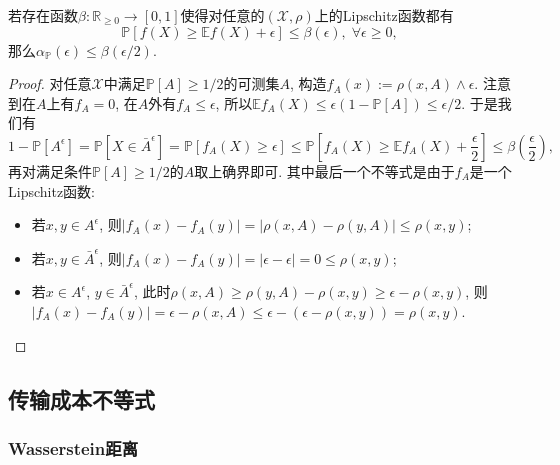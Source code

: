 \begin{theorem}
	若存在函数$\beta \colon \mathbb{R}_{\geq 0} \to [0, 1]$使得对任意的$(\mathcal{X}, \rho)$上的Lipschitz函数都有
	\begin{equation*}
		\mathbb{P}[f(X) \geq \mathbb{E}f(X) + \epsilon] \leq \beta(\epsilon),\; \forall \epsilon \geq 0, 
	\end{equation*}
	那么$\alpha_{\mathbb{P}}(\epsilon) \leq \beta(\epsilon / 2)$. 
\end{theorem}
\begin{proof}
	对任意$\mathcal{X}$中满足$\mathbb{P}[A] \geq 1/2$的可测集$A$, 构造$f_A(x) := \rho(x, A) \wedge \epsilon$. 
	注意到在$A$上有$f_A = 0$, 在$A$外有$f_A \leq \epsilon$, 所以$\mathbb{E}f_A(X) \leq \epsilon (1 - \mathbb{P}[A]) \leq \epsilon / 2$. 
	于是我们有
	\begin{equation*}
		1 - \mathbb{P}[A^\epsilon]
		= \mathbb{P}[X \in \bar A^{\epsilon}]
		= \mathbb{P}[f_A(X) \geq \epsilon] 
		\leq \mathbb{P}\left[f_A(X) \geq \mathbb{E}f_A(X) + \frac{\epsilon}{2}\right]
		\leq \beta\left( \frac{\epsilon}{2} \right),  
	\end{equation*}
	再对满足条件$\mathbb{P}[A] \geq 1/2$的$A$取上确界即可. 
	其中最后一个不等式是由于$f_A$是一个Lipschitz函数: 
	\begin{itemize}
		\item 若$x, y \in A^{\epsilon}$, 则$|f_A(x) - f_A(y)| = |\rho(x, A) - \rho(y, A) | \leq  \rho(x, y)$; 
		\item 若$x, y \in \bar A^{\epsilon}$, 则$|f_A(x) - f_A(y)| = |\epsilon - \epsilon| = 0 \leq \rho(x, y)$;
		\item 若$x \in A^{\epsilon}$, $y \in \bar A^{\epsilon}$, 此时$\rho(x, A) \geq \rho(y, A) - \rho(x, y) \geq \epsilon - \rho(x, y)$, 则$|f_A(x) - f_A(y)| =  \epsilon - \rho(x, A) \leq \epsilon - (\epsilon - \rho(x, y)) = \rho(x, y)$.
	\end{itemize}
\end{proof}


\subsection{传输成本不等式}

\subsubsection{Wasserstein距离}

